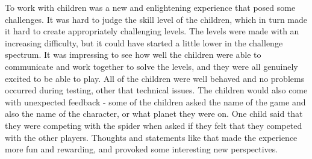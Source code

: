 To work with children was a new and enlightening experience that posed some challenges. It was hard to judge the skill level of the children, which in turn made it hard to create appropriately challenging levels. The levels were made with an increasing difficulty, but it could have started a little lower in the challenge spectrum. It was impressing to see how well the children were able to communicate and work together to solve the levels, and they were all genuinely excited to be able to play. All of the children were well behaved and no problems occurred during testing, other that technical issues. The children would also come with unexpected feedback - some of the children asked the name of the game and also the name of the character, or what planet they were on. One child said that they were competing with the spider when asked if they felt that they competed with the other players. Thoughts and statements like that made the experience more fun and rewarding, and provoked some interesting new perspectives. 
